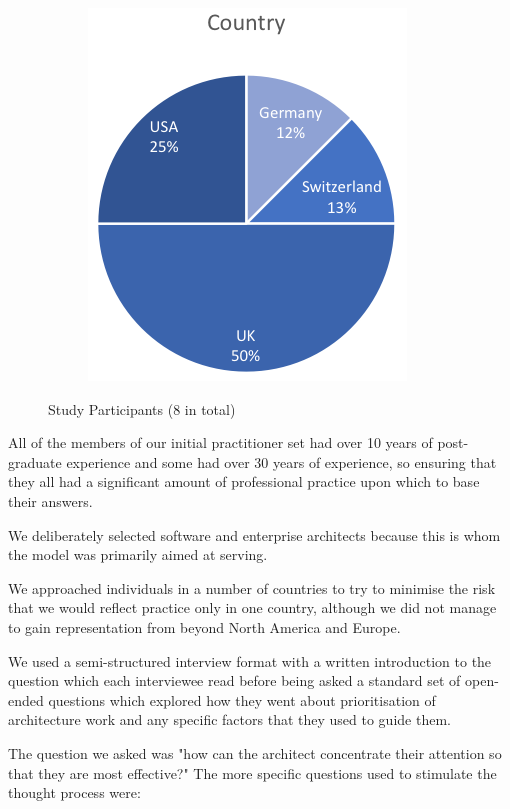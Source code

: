 \begin{figure}
\begin{subfigure}{.5\linewidth}
   \end{subfigure}
   \begin{subfigure}{\linewidth}
      \centering
      \includegraphics[scale=1.0]{Figures/prioritisation-countries}
   \end{subfigure}

   \caption{Study Participants (8 in total)}
   \label{figure:participants}
\end{figure}  

All of the members of our initial practitioner set had over 10 years of post-graduate experience and some had over 30 years of experience, so ensuring that they all had a significant amount of professional practice upon which to base their answers.

We deliberately selected software and enterprise architects because this is whom the model was primarily aimed at serving.

We approached individuals in a number of countries to try to minimise the risk that we would reflect practice only in one country, although we did not manage to gain representation from beyond North America and Europe.

We used a semi-structured interview format with a written introduction to the question which each interviewee read before being asked a standard set of open-ended questions which explored how they went about prioritisation of architecture work and any specific factors that they used to guide them.  

The question we asked was "how can the architect concentrate their attention so that they are most effective?" The more specific questions used to stimulate the thought process were: 

